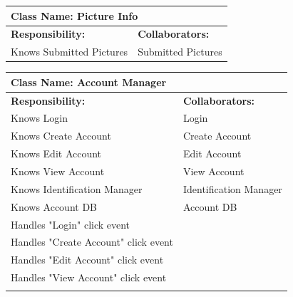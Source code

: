 \documentclass[]{article}
\begin{document}
\begin{itemize}
	\begin{table}
		\centering
		\begin{tabular}{|p{8cm}|p{8cm}|}
		\hline 
		 \multicolumn{2}{|l|}{\textbf{Class Name:} Picture Info} \\
		\hline
		\textbf{Responsibility:} & \textbf{Collaborators:} \\
		\hline
            Knows Submitted Pictures & Submitted Pictures 
		\vspace{1in} \\
		\hline
		\end{tabular}
	\end{table}

	\begin{table}
		\centering
		\begin{tabular}{|p{8cm}|p{8cm}|}
		\hline 
		 \multicolumn{2}{|l|}{\textbf{Class Name:} Account Manager} \\
		\hline
		\textbf{Responsibility:} & \textbf{Collaborators:} \\
		\hline
            Knows Login & Login \\
            Knows Create Account & Create Account \\
            Knows Edit Account & Edit Account \\
            Knows View Account & View Account \\
            Knows Identification Manager & Identification Manager \\
            Knows Account DB & Account DB \\
            Handles "Login" click event & \\
            Handles "Create Account" click event & \\
            Handles "Edit Account" click event & \\
            Handles "View Account" click event & \\
		\vspace{1cm} & \\
		\hline
		\end{tabular}
	\end{table}


\end{itemize}
\end{document}
